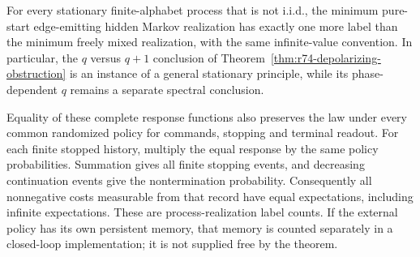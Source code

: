 \begin{corollary}
\label{cor:r75-stationary-process}
For every stationary finite-alphabet process that is not i.i.d., the
minimum pure-start edge-emitting hidden Markov realization has exactly
one more label than the minimum freely mixed realization, with the same
infinite-value convention.  In particular, the $q$ versus $q+1$ conclusion
of Theorem~\ref{thm:r74-depolarizing-obstruction} is an instance of a
general stationary principle, while its phase-dependent $q$ remains a
separate spectral conclusion.
\end{corollary}

Equality of these complete response functions also preserves the law
under every common randomized policy for commands, stopping and terminal
readout.  For each finite stopped history, multiply the equal response by
the same policy probabilities.  Summation gives all finite stopping
events, and decreasing continuation events give the nontermination
probability.  Consequently all nonnegative costs measurable from that
record have equal expectations, including infinite expectations.  These
are process-realization label counts.  If the external policy has its own
persistent memory, that memory is counted separately in a closed-loop
implementation; it is not supplied free by the theorem.
